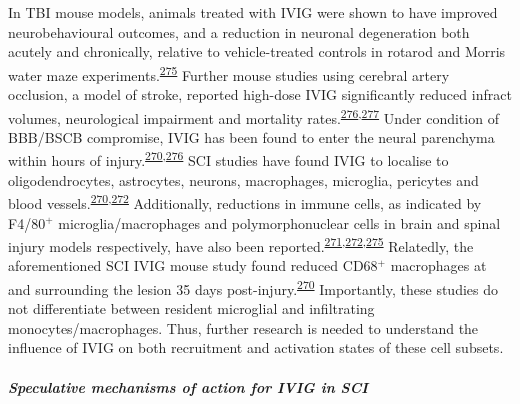 \documentclass[
]{article}
\begin{document}
In TBI mouse models, animals treated with IVIG were shown to have improved neurobehavioural outcomes, and a reduction in neuronal degeneration both acutely and chronically, relative to vehicle-treated controls in rotarod and Morris water maze experiments.\textsuperscript{\protect\hyperlink{ref-jeong_intravenous_2014}{275}}
Further mouse studies using cerebral artery occlusion, a model of stroke, reported high-dose IVIG significantly reduced infract volumes, neurological impairment and mortality rates.\textsuperscript{\protect\hyperlink{ref-arumugam_intravenous_2007}{276},\protect\hyperlink{ref-widiapradja_intravenous_2012}{277}}
Under condition of BBB/BSCB compromise, IVIG has been found to enter the neural parenchyma within hours of injury.\textsuperscript{\protect\hyperlink{ref-brennan_ivig_2016}{270},\protect\hyperlink{ref-arumugam_intravenous_2007}{276}}
SCI studies have found IVIG to localise to oligodendrocytes, astrocytes, neurons, macrophages, microglia, pericytes and blood vessels.\textsuperscript{\protect\hyperlink{ref-brennan_ivig_2016}{270},\protect\hyperlink{ref-chio_effects_2019}{272}}
Additionally, reductions in immune cells, as indicated by F4/80\(^+\) microglia/macrophages and polymorphonuclear cells in brain and spinal injury models respectively, have also been reported.\textsuperscript{\protect\hyperlink{ref-nguyen_immunoglobulin_2012}{271},\protect\hyperlink{ref-chio_effects_2019}{272},\protect\hyperlink{ref-jeong_intravenous_2014}{275}}
Relatedly, the aforementioned SCI IVIG mouse study found reduced CD68\(^+\) macrophages at and surrounding the lesion 35 days post-injury.\textsuperscript{\protect\hyperlink{ref-brennan_ivig_2016}{270}}
Importantly, these studies do not differentiate between resident microglial and infiltrating monocytes/macrophages.
Thus, further research is needed to understand the influence of IVIG on both recruitment and activation states of these cell subsets.

\hypertarget{speculative-mechanisms-of-action-for-ivig-in-sci}{%
\subparagraph{Speculative mechanisms of action for IVIG in SCI}\label{speculative-mechanisms-of-action-for-ivig-in-sci}}
\end{document}
